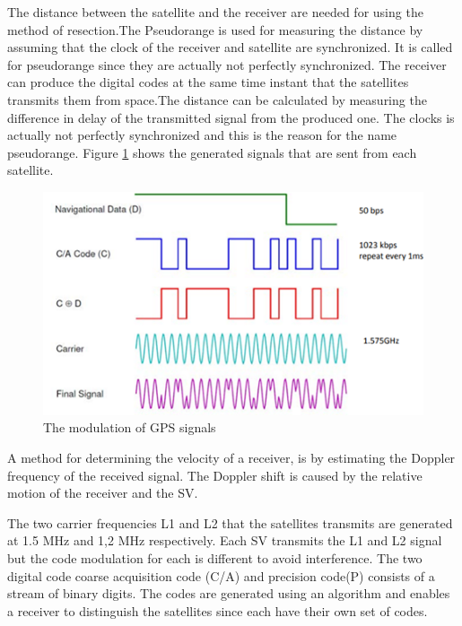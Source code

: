  The distance between the satellite and the receiver are needed for using the method of resection.The Pseudorange is used for measuring the distance by assuming that the clock of the receiver and satellite are synchronized. It is called for pseudorange since they are actually not perfectly synchronized. The receiver can produce the digital codes at the same time instant that the satellites transmits them from space.The distance can be calculated by measuring the difference in delay of the transmitted signal from the produced one. The clocks is actually not perfectly synchronized and this is the reason for the name pseudorange. Figure \ref{fig:modulation} shows the generated signals that are sent from each satellite. 
  \begin{figure}[H]
\centering
\includegraphics[width=16 cm]{Project_Report/Images/code_data.png}
\caption{The modulation of GPS signals}
\label{fig:modulation}
\end{figure}
 
 
 A method for determining the velocity of a receiver, is by estimating the Doppler frequency of the received signal. The Doppler shift is caused by the relative motion of the receiver and the SV.
 
 The two carrier frequencies L1 and L2 that the satellites transmits are generated at 1.5 MHz and 1,2 MHz respectively.  Each SV transmits the L1 and L2 signal but the code modulation for each is different to avoid interference. The two digital code coarse acquisition code (C/A) and precision code(P) consists of a stream of binary digits. The codes are generated using an algorithm and enables a receiver to distinguish the satellites since each have their own set of codes. 
 
